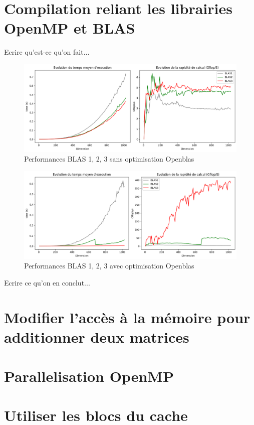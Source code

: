 \documentclass{report}
\begin{document}
\tableofcontents

\newpage


\chapter{Compilation reliant les librairies OpenMP et BLAS}

Ecrire qu'est-ce qu'on fait...

\begin{figure}[H]
    \centering
    \includegraphics[width=0.7\linewidth]{images/fig1.png}
    \caption{Performances BLAS 1, 2, 3 sans optimisation Openblas}
    \label{fig:1}
\end{figure}

\begin{figure}[H]
    \centering
    \includegraphics[width=0.7\linewidth]{images/fig2.png}
    \caption{Performances BLAS 1, 2, 3 avec optimisation Openblas}
    \label{fig:2}
\end{figure}

Ecrire ce qu'on en conclut...

\chapter{Modifier l'accès à la mémoire pour additionner deux matrices}

\chapter{Parallelisation OpenMP}

\chapter{Utiliser les blocs du cache}



\end{document}
